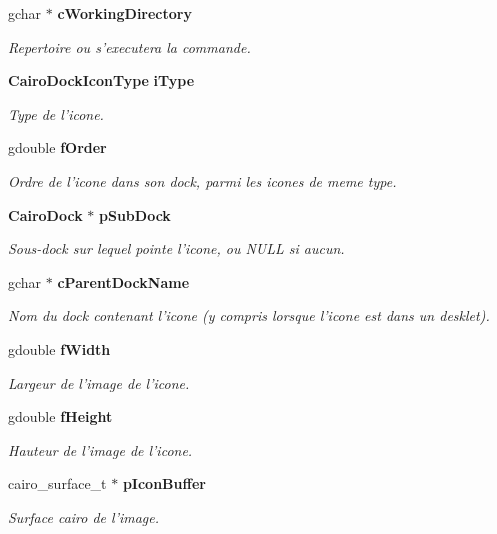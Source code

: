 \begin{CompactItemize}
gchar $\ast$ {\bf cWorkingDirectory}
\begin{CompactList}\small\item\em Repertoire ou s'executera la commande. \item\end{CompactList}\item 
{\bf CairoDockIconType} {\bf iType}
\begin{CompactList}\small\item\em Type de l'icone. \item\end{CompactList}\item 
gdouble {\bf fOrder}
\begin{CompactList}\small\item\em Ordre de l'icone dans son dock, parmi les icones de meme type. \item\end{CompactList}\item 
{\bf CairoDock} $\ast$ {\bf pSubDock}
\begin{CompactList}\small\item\em Sous-dock sur lequel pointe l'icone, ou NULL si aucun. \item\end{CompactList}\item 
gchar $\ast$ {\bf cParentDockName}
\begin{CompactList}\small\item\em Nom du dock contenant l'icone (y compris lorsque l'icone est dans un desklet). \item\end{CompactList}\item 
gdouble {\bf fWidth}
\begin{CompactList}\small\item\em Largeur de l'image de l'icone. \item\end{CompactList}\item 
gdouble {\bf fHeight}
\begin{CompactList}\small\item\em Hauteur de l'image de l'icone. \item\end{CompactList}\item 
cairo\_\-surface\_\-t $\ast$ {\bf pIconBuffer}
\begin{CompactList}\small\item\em Surface cairo de l'image. \item\end{CompactList}\item 

\end{CompactItemize}
